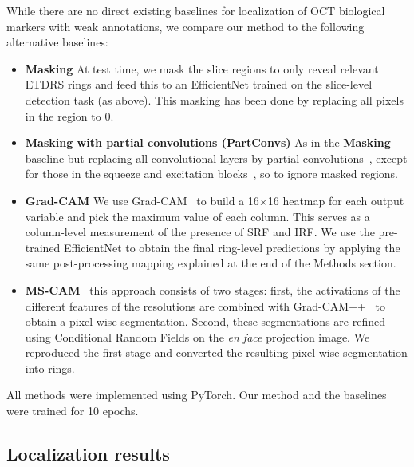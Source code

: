 While there are no direct existing baselines for localization of OCT biological markers with weak annotations, we compare our method to the following alternative baselines:
\begin{itemize}
    \item \textbf{Masking} At test time, we mask the slice regions to only reveal relevant ETDRS rings and feed this to an EfficientNet trained on the slice-level detection task (as above). This masking has been done by replacing all pixels in the region to 0.
    
    \item \textbf{Masking with partial convolutions (PartConvs)} As in the \textbf{Masking} baseline but replacing all convolutional layers by partial convolutions~, except for those in the squeeze and excitation blocks~, so to ignore masked regions.
    
    \item \textbf{Grad-CAM} We use Grad-CAM~ to build a 16×16 heatmap for each output variable and pick the maximum value of each column. This serves as a column-level measurement of the presence of SRF and IRF. We use the pre-trained EfficientNet to obtain the final ring-level predictions by applying the same post-processing mapping explained at the end of the Methods section.

    \item \textbf{MS-CAM}~ this approach consists of two stages: first, the activations of the different features of the resolutions are combined with Grad-CAM++~ to obtain a pixel-wise segmentation. Second, these segmentations are refined using Conditional Random Fields on the \textit{en face} projection image. We reproduced the first stage and converted the resulting pixel-wise segmentation into rings. 
\end{itemize}

All methods were implemented using PyTorch. Our method and the baselines were trained for 10 epochs.

\subsection{Localization results}

